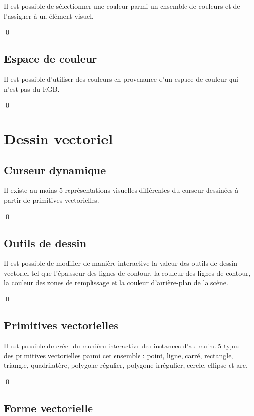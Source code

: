 \documentclass[12pt]{article}
\newcommand{\state}{\noindent}
\begin{document}
\state
Il est possible de sélectionner une couleur parmi un ensemble de couleurs et de l'assigner à un élément visuel.

\qed

\subsection{Espace de couleur}

\state
Il est possible d'utiliser des couleurs en provenance d'un espace de couleur qui n'est pas du RGB.

\qed

\pagebreak

\section{Dessin vectoriel}

\subsection{Curseur dynamique}

\state
Il existe au moins 5 représentations visuelles différentes du curseur dessinées à partir de primitives vectorielles.

\qed

\subsection{Outils de dessin}

\state
Il est possible de modifier de manière interactive la valeur des outils de dessin vectoriel tel que l'épaisseur des lignes de contour, la couleur des lignes de contour, la couleur des zones de remplissage et la couleur d'arrière-plan de la scène.

\qed

\subsection{Primitives vectorielles}

\state
Il est possible de créer de manière interactive des instances d'au moins 5 types des primitives vectorielles parmi cet ensemble : point, ligne, carré, rectangle, triangle, quadrilatère, polygone régulier, polygone irrégulier, cercle, ellipse et arc.

\qed

\subsection{Forme vectorielle}
\end{document}
